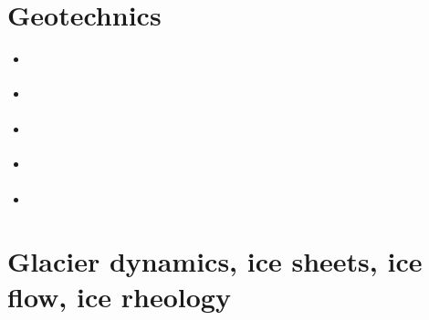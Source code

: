 \section{Geotechnics}

\begin{scriptsize}
\begin{itemize}
\item[\nineteenninetynine] 
\textcite{ster99} 
\item[\twothousandthree] 
\textcite{gora03} 
\textcite{zhll03} 
\item[\twothousandfour] 
\textcite{gour04} 
\item[\twothousandsix] 
\textcite{gork06} 
\item[\twothousandfourteen] 
\textcite{bufy14} 
\end{itemize}
\end{scriptsize}

\section{Glacier dynamics, ice sheets, ice flow, ice rheology}

